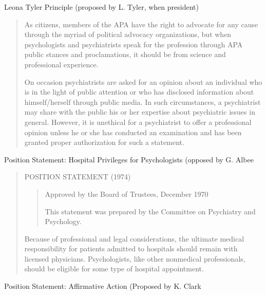 \begin{refsection}
\begin{apatextbox}{Leona Tyler Principle (proposed by L. Tyler, when president)}

\begin{quote}

As citizens, members of the APA have the right to advocate for any cause through the myriad of political advocacy organizations, but when psychologists and psychiatrists speak for the profession through APA public stances and proclamations, it should be from science and professional experience. 

On occasion psychiatrists are asked for an opinion about an individual who is in the light of public attention or who has disclosed information about himself\slash herself through public media. In such circumstances, a psychiatrist may share with the public his or her expertise about psychiatric issues in general. However, it is unethical for a psychiatrist to offer a professional opinion unless he or she has conducted an examination and has been granted proper authorization for such a statement.
\end{quote}

\label{leonatylerprinciple}
\end{apatextbox}

\begin{apatextbox}{Position Statement: Hospital Privileges for Psychologists (opposed by G. Albee}

\begin{quote}

POSITION STATEMENT (1974)

\begin{quote}

Approved by the Board of Trustees, December 1970

This statement was prepared by the Committee on Psychiatry and Psychology.
\end{quote}

Because of professional and legal considerations, the ultimate medical responsibility for patients admitted to hospitals should remain with licensed physicians. Psychologists, like other nonmedical professionals, should be eligible for some type of hospital appointment.
\end{quote}

\label{hospitalprivledges} \end{apatextbox}

\begin{apatextbox}{Position Statement: Affirmative Action (Proposed by K. Clark}


\end{apatextbox}
\end{refsection}
